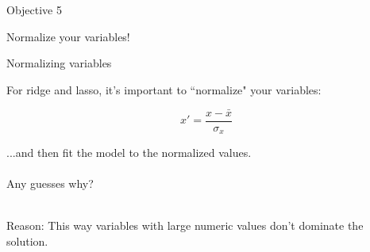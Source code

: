 \documentclass[mathserif, aspectratio=169]{beamer}
\begin{document}
\begin{frame}{Objective 5}

Normalize your variables!

\end{frame}

\begin{frame}{Normalizing variables}

For ridge and lasso, it's important to ``normalize" your variables:

\begin{equation}
x' = \frac{x - \bar{x}}{\sigma_x}
\end{equation}

...and then fit the model to the normalized values.  \\~\\

Any guesses why?\\~\\

\pause

Reason: This way variables with large numeric values don't dominate the solution.  

\end{frame}
\end{document}
